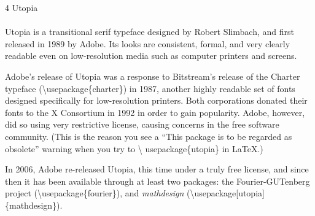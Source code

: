 \documentclass{article}
\begin{document}
\frenchspacing

\noindent
{\LARGE 4 Utopia}\\
~\\
Utopia is a transitional serif typeface designed by Robert Slimbach, and
first released in 1989 by Adobe.  Its looks are consistent, formal, and very
clearly readable even on low-resolution media such as computer printers and
screens.

Adobe's release of Utopia was a response to Bitstream's release of the
Charter typeface (\textbackslash usepackage\{charter\}) in 1987,
another highly readable set of fonts designed specifically for
low-resolution printers.  Both corporations donated their fonts to the
X Consortium in 1992 in order to gain popularity.  Adobe, however, did
so using very restrictive license, causing concerns in the free
software community.  (This is the reason you see a ``This package is
to be regarded as obsolete'' warning when you try to \textbackslash
usepackage\{utopia\} in \LaTeX.)

In 2006, Adobe re-released Utopia, this time under a truly free license, and
since then it has been available through at least two packages: the
Fourier-GUTenberg project (\textbackslash usepackage\{fourier\}), and
\emph{mathdesign} (\textbackslash usepackage[utopia]\{mathdesign\}).
\end{document}
